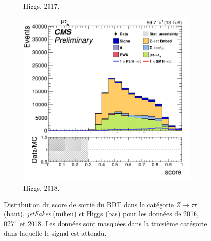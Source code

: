 \begin{figure}[!ht]
\begin{subfigure}[b]{0.33\linewidth}
    \caption{Higgs, 2017.} 
    \vspace{0.5ex}
  \end{subfigure} 
    \begin{subfigure}[b]{0.33\linewidth}
    \centering
    \includegraphics[width=\linewidth]{Chapitre7/Images/CtrlPlots/2018/BDTscoreHiggs.png} 
    \caption{Higgs, 2018.} 
    \vspace{0.5ex}
  \end{subfigure} 
  \caption{Distribution du score de sortie du BDT dans la catégorie $Z\to\tau\tau$ (haut), \textit{jetFakes} (milieu) et Higgs (bas) pour les données de 2016, 0271 et 2018. Les données sont masquées dans la troisième catégorie dans laquelle le signal est attendu.}
  \label{BDTscores}
\end{figure}